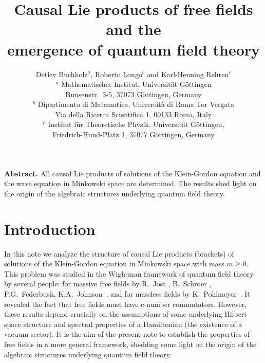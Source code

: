 \documentclass[11pt]{article}
\begin{document}
\title{\LARGE Causal Lie products of free fields and the \\
emergence of quantum field theory}
\author{Detlev Buchholz${}^a$, Roberto Longo${}^b$ and
  Karl-Henning Rehren${}^c$ \\[20pt]
\small  
${}^a$ Mathematisches Institut, Universit\"at G\"ottingen \\
\small Bunsenstr.\ 3-5, 37073 G\"ottingen, Germany \\[5pt] 
\small
${}^b$ 
Dipartimento di Matematica,
Università di Roma Tor Vergata  \\
\small Via della Ricerca Scientifica 1, 00133 Roma, Italy \\[5pt] 
\small
${}^c$ Institut für Theoretische Physik, Universit\"at G\"ottingen, \\
\small Friedrich-Hund-Platz 1, 37077 G\"ottingen, Germany \\[5pt] 
}
\date{}

\maketitle

\noindent \textbf{Abstract.}   
All causal Lie products of solutions of the
Klein-Gordon equation and the wave equation in Minkowski space
are determined. The results shed light on the
origin of the algebraic structures underlying quantum field theory.



\section{Introduction}
\noindent In this note we analyze the structure of
causal Lie products (brackets)
of solutions of the Klein-Gordon equation
in Minkowski space with mass $m \geq 0$. This problem was
studied in the Wightman framework of quantum field
theory by several people: for massive
free fields by R.~Jost \cite{Jo}, B.~Schroer \cite{Sch},
P.G.~Federbush, K.A.~Johnson~\cite{FeJo}, and for massless fields by
K.~Pohlmeyer~\cite{Po}. It revealed the fact
that free fields must have c-number commutators.
However, these results depend crucially on the
assumptions of some underlying Hilbert space structure and
spectral properties of a Hamiltonian (the existence of
a vacuum sector). It is the aim of
the present note to establish the 
properties of free fields in a more general framework,
shedding some light on the origin of the algebraic structures 
underlying quantum field theory. 
\end{document}
